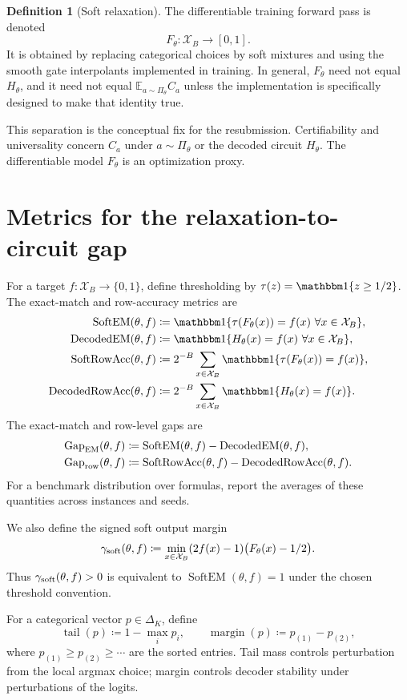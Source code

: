 \documentclass[11pt]{article}
\theoremstyle{definition}
\newtheorem{definition}[theorem]{Definition}
\theoremstyle{remark}
\newcommand{\X}{\mathcal X}
\newcommand{\E}{\mathbb E}
\newcommand{\one}{\mathbbm 1}
\newcommand{\tail}{\operatorname{tail}}
\newcommand{\SoftEM}{\operatorname{SoftEM}}
\newcommand{\DecEM}{\operatorname{DecodedEM}}
\newcommand{\SoftAcc}{\operatorname{SoftRowAcc}}
\newcommand{\DecAcc}{\operatorname{DecodedRowAcc}}
\newcommand{\Gap}{\operatorname{Gap}}
\newcommand{\gammsoft}{\gamma_{\rm soft}}
\newcommand{\bits}{\{0,1\}}
\begin{document}
\begin{definition}[Soft relaxation]
The differentiable training forward pass is denoted
\[
    F_\theta:\X_B\to[0,1].
\]
It is obtained by replacing categorical choices by soft mixtures and using the smooth gate interpolants implemented in training.  In general, $F_\theta$ need not equal $H_\theta$, and it need not equal $\E_{a\sim\Pi_\theta} C_a$ unless the implementation is specifically designed to make that identity true.
\end{definition}

This separation is the conceptual fix for the resubmission.  Certifiability and universality concern $C_a$ under $a\sim\Pi_\theta$ or the decoded circuit $H_\theta$.  The differentiable model $F_\theta$ is an optimization proxy.

\section{Metrics for the relaxation-to-circuit gap}

For a target $f:\X_B\to\bits$, define thresholding by $\tau(z)=\one\{z\ge 1/2\}$.  The exact-match and row-accuracy metrics are
\begin{align*}
\SoftEM(\theta,f)
&\coloneqq
\one\{\tau(F_\theta(x))=f(x)\ \forall x\in\X_B\},\\
\DecEM(\theta,f)
&\coloneqq
\one\{H_\theta(x)=f(x)\ \forall x\in\X_B\},\\
\SoftAcc(\theta,f)
&\coloneqq
2^{-B}\sum_{x\in\X_B}\one\{\tau(F_\theta(x))=f(x)\},\\
\DecAcc(\theta,f)
&\coloneqq
2^{-B}\sum_{x\in\X_B}\one\{H_\theta(x)=f(x)\}.
\end{align*}
The exact-match and row-level gaps are
\begin{align*}
    \Gap_{\rm EM}(\theta,f)&\coloneqq \SoftEM(\theta,f)-\DecEM(\theta,f),\\
    \Gap_{\rm row}(\theta,f)&\coloneqq \SoftAcc(\theta,f)-\DecAcc(\theta,f).
\end{align*}
For a benchmark distribution over formulas, report the averages of these quantities across instances and seeds.

We also define the signed soft output margin
\[
    \gammsoft(\theta,f)
    \coloneqq
    \min_{x\in\X_B} (2f(x)-1)\big(F_\theta(x)-1/2\big).
\]
Thus $\gammsoft(\theta,f)>0$ is equivalent to $\SoftEM(\theta,f)=1$ under the chosen threshold convention.

For a categorical vector $p\in\Delta_K$, define
\[
    \tail(p)\coloneqq 1-\max_i p_i,
    \qquad
    \operatorname{margin}(p)\coloneqq p_{(1)}-p_{(2)},
\]
where $p_{(1)}\ge p_{(2)}\ge\cdots$ are the sorted entries.  Tail mass controls perturbation from the local argmax choice; margin controls decoder stability under perturbations of the logits.
\end{document}
